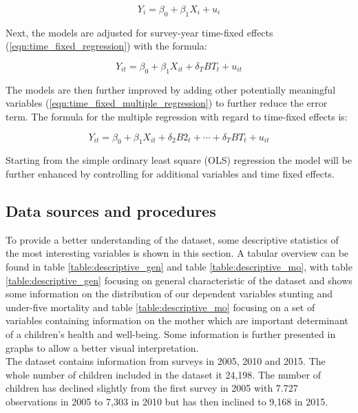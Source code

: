 \documentclass[a4paper, 11pt]{article} %
\begin{document}
\begin{equation}
 Y_i = \beta_0 + \beta_1 X_i + u_i
 \label{eqn:simple_regression}
\end{equation}

Next, the models are adjusted for survey-year time-fixed effects (\ref{eqn:time_fixed_regression}) with the formula:

\begin{equation}
Y_{it} = \beta_0 + \beta_1 X_{it} + \delta_T BT_t + u_{it}
 \label{eqn:time_fixed_regression}
\end{equation}

The models are then further improved by adding other potentially meaningful variables (\ref{eqn:time_fixed_multiple_regression}) to further reduce the error term. The formula for the multiple regression with regard to time-fixed effects is:

\begin{equation}
Y_{it} = \beta_0 + \beta_1 X_{it} + \delta_2 B2_t + \cdots + \delta_T BT_t + u_{it}
 \label{eqn:time_fixed_multiple_regression}
\end{equation}

Starting from the simple ordinary least square (OLS) regression the model will be further enhanced by controlling for additional variables and time fixed effects. 

\subsection*{Data sources and procedures}
To provide a better understanding of the dataset, some descriptive statistics of the most interesting variables is shown in this section. A tabular overview can be found in
 table \ref{table:descriptive_gen} and table \ref{table:descriptive_mo}, with table \ref{table:descriptive_gen} focusing on general characteristic of the dataset and shows some information on the distribution of our dependent variables stunting and under-five mortality and table \ref{table:descriptive_mo} focusing on a set of variables containing information on the mother which are important determinant of a children's health and well-being. Some information is further presented in graphs to allow a better visual interpretation. \\
 
 The dataset contains information from surveys in 2005, 2010 and 2015. The whole number of children included in the dataset it 24,198. The number of children has declined slightly from the first survey in 2005 with 7.727 observations in 2005 to 7,303 in 2010 but has then inclined to 9,168 in 2015. \\
\end{document}
